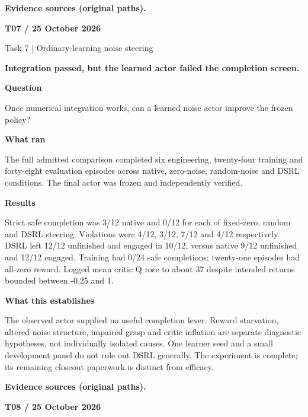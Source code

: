 \documentclass[11pt,a4paper]{article}
\newcommand{\block}[2]{\par\textbf{\color{ink}#1}\par\nopagebreak #2\par}
\newcommand{\finding}[1]{\begin{tcolorbox}[colback=pale,colframe=pale,boxrule=0pt,arc=1mm,left=10pt,right=10pt,top=10pt,bottom=10pt]\color{ink}\large\bfseries #1\end{tcolorbox}}
\begin{document}
\vfill{\footnotesize\color{muted}\textbf{Evidence sources (original paths).}\par
\raggedright {}\par {}}
\clearpage
{}\label{exp:T07}
{\color{accent}\small\bfseries T07 / 25 October 2026}\par
{}\par
{\color{muted}\small Task 7 | Ordinary-learning noise steering}\par\vspace{2mm}
\finding{Integration passed, but the learned actor failed the completion screen.}
\block{Question}{Once numerical integration works, can a learned noise actor improve the frozen policy?}
\block{What ran}{The full admitted comparison completed six engineering, twenty-four training and forty-eight evaluation episodes across native, zero-noise, random-noise and DSRL conditions. The final actor was frozen and independently verified.}
\block{Results}{Strict safe completion was 3/12 native and 0/12 for each of fixed-zero, random and DSRL steering. Violations were 4/12, 3/12, 7/12 and 4/12 respectively. DSRL left 12/12 unfinished and engaged in 10/12, versus native 9/12 unfinished and 12/12 engaged. Training had 0/24 safe completions; twenty-one episodes had all-zero reward. Logged mean critic Q rose to about 37 despite intended returns bounded between -0.25 and 1.}
\block{What this establishes}{The observed actor supplied no useful completion lever. Reward starvation, altered noise structure, impaired grasp and critic inflation are separate diagnostic hypotheses, not individually isolated causes. One learner seed and a small development panel do not rule out DSRL generally. The experiment is complete; its remaining closeout paperwork is distinct from efficacy.}
\vfill{\footnotesize\color{muted}\textbf{Evidence sources (original paths).}\par
\raggedright {}\par {}\par {}}
\clearpage
{}\label{exp:T08}
{\color{accent}\small\bfseries T08 / 25 October 2026}\par
{}\par
\end{document}

